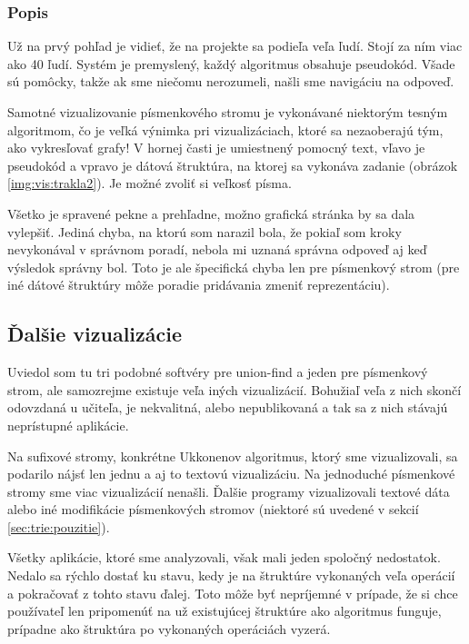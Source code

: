 \subsubsection{Popis}

Už na prvý pohľad je vidieť, že na projekte sa podieľa veľa ľudí. Stojí za ním 
viac ako 40 ľudí. Systém je premyslený, každý algoritmus obsahuje pseudokód. 
Všade sú pomôcky, takže ak sme niečomu nerozumeli, našli sme navigáciu na 
odpoveď. 

Samotné vizualizovanie písmenkového stromu je vykonávané niektorým tesným 
algoritmom, čo je veľká výnimka pri vizualizáciach, ktoré sa nezaoberajú tým, 
ako vykresľovať grafy! V hornej časti je umiestnený pomocný text, vľavo je 
pseudokód a vpravo je dátová štruktúra, na ktorej sa vykonáva zadanie (obrázok 
\ref{img:vis:trakla2}). Je možné zvoliť si veľkosť písma.

Všetko je spravené pekne a prehľadne, možno grafická stránka by sa dala 
vylepšiť. Jediná chyba, na ktorú som narazil bola, že pokiaľ som kroky 
nevykonával v správnom poradí, nebola mi uznaná správna odpoveď aj keď 
výsledok správny bol. Toto je ale špecifická chyba len pre písmenkový strom 
(pre iné dátové štruktúry môže poradie pridávania zmeniť reprezentáciu).

\subsection{Ďalšie vizualizácie}

Uviedol som tu tri podobné softvéry pre union-find a jeden pre písmenkový 
strom, ale samozrejme existuje veľa iných vizualizácií. Bohužiaľ veľa z nich 
skončí odovzdaná u učiteľa, je nekvalitná, alebo nepublikovaná a tak sa z nich 
stávajú neprístupné aplikácie.

Na sufixové stromy, konkrétne Ukkonenov algoritmus, ktorý sme vizualizovali, 
sa podarilo nájsť len jednu a aj to textovú vizualizáciu. Na jednoduché 
písmenkové stromy sme viac vizualizácií nenašli. Ďalšie programy vizualizovali 
textové dáta alebo iné modifikácie písmenkových stromov (niektoré sú uvedené v 
sekcií \ref{sec:trie:pouzitie}).

Všetky aplikácie, ktoré sme analyzovali, však mali jeden spoločný nedostatok. 
Nedalo sa rýchlo dostať ku stavu, kedy je na štruktúre vykonaných veľa operácií 
a pokračovať z tohto stavu ďalej. Toto môže byť nepríjemné v prípade, že si 
chce používateľ len pripomenúť na už existujúcej štruktúre ako algoritmus 
funguje, prípadne ako štruktúra po vykonaných operáciách vyzerá.

